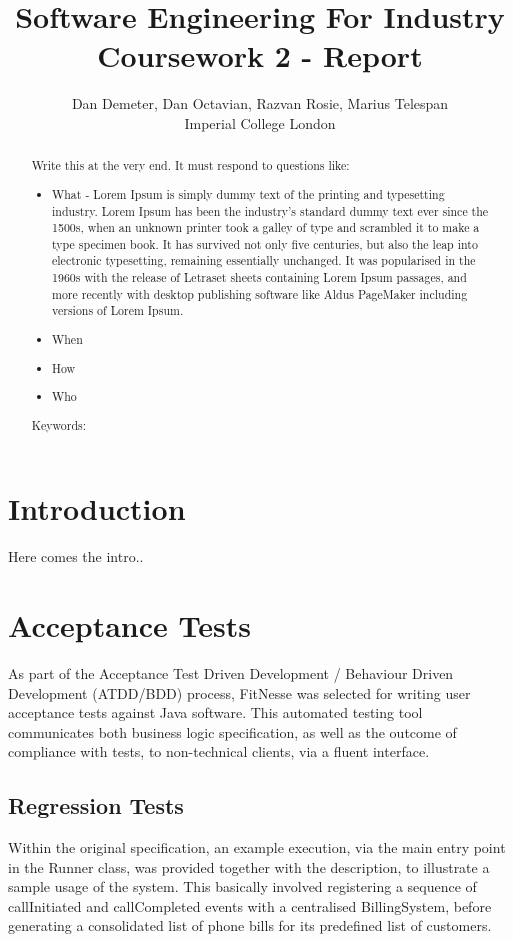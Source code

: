\documentclass[11pt,twocolumn]{article} %
\title{Software Engineering For Industry \\ Coursework 2 - Report}
\author{Dan Demeter, Dan Octavian, Razvan Rosie, Marius Telespan \\Imperial College London}
\begin{document}
\maketitle

\begin{abstract}
Write this at the very end. It must respond to questions like:
\begin{itemize}
 \item {What - Lorem Ipsum is simply dummy text of the printing and typesetting industry. Lorem Ipsum has been the industry's standard dummy text ever since the 1500s,
 when an unknown printer took a galley of type and scrambled it to make a type specimen book. It has survived not only five centuries, but also the leap into electronic typesetting, remaining essentially unchanged.
 It was popularised in the 1960s with the release of Letraset sheets containing Lorem Ipsum passages, and more recently with desktop publishing software like Aldus PageMaker including versions of Lorem Ipsum.}
 \item {When}
 \item {How}
 \item {Who}
\end{itemize}

Keywords:
\end{abstract}

\pagebreak

\section{Introduction}
Here comes the intro..

\section{Acceptance Tests}
As part of the Acceptance Test Driven Development / Behaviour Driven Development (ATDD/BDD) process, FitNesse was selected for writing user acceptance tests against Java software.
This automated testing tool communicates both business logic specification, as well as the outcome of compliance with tests, to non-technical clients, via a fluent interface.

\subsection{Regression Tests}
Within the original specification, an example execution, via the main entry point in the Runner class, was provided together with the description, to illustrate a sample usage of the system.
This basically involved registering a sequence of callInitiated and callCompleted events with a centralised BillingSystem, before generating a consolidated list of phone bills for its predefined list of customers.
\end{document}
